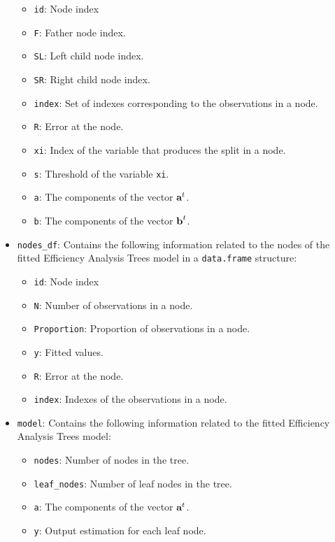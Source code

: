 \begin{itemize}
  \begin{itemize}
  \tightlist
  \item
    \texttt{id}: Node index
  \item
    \texttt{F}: Father node index.
  \item
    \texttt{SL}: Left child node index.
  \item
    \texttt{SR}: Right child node index.
  \item
    \texttt{index}: Set of indexes corresponding to the observations in a node.
  \item
    \texttt{R}: Error at the node.
  \item
    \texttt{xi}: Index of the variable that produces the split in a node.
  \item
    \texttt{s}: Threshold of the variable \texttt{xi}.
  \item
    \texttt{a}: The components of the vector \({\it \textbf{a}}^{t}\).
  \item
    \texttt{b}: The components of the vector \({\it \textbf{b}}^{t}\).
  \end{itemize}
\item
  \texttt{nodes\_df}: Contains the following information related to the nodes of the fitted Efficiency Analysis Trees model in a \texttt{data.frame} structure:

  \begin{itemize}
  \tightlist
  \item
    \texttt{id}: Node index
  \item
    \texttt{N}: Number of observations in a node.
  \item
    \texttt{Proportion}: Proportion of observations in a node.
  \item
    \texttt{y}: Fitted values.
  \item
    \texttt{R}: Error at the node.
  \item
    \texttt{index}: Indexes of the observations in a node.
  \end{itemize}
\item
  \texttt{model}: Contains the following information related to the fitted Efficiency Analysis Trees model:

  \begin{itemize}
  \tightlist
  \item
    \texttt{nodes}: Number of nodes in the tree.
  \item
    \texttt{leaf\_nodes}: Number of leaf nodes in the tree.
  \item
    \texttt{a}: The components of the vector \({\it \textbf{a}}^{t}\).
  \item
    \texttt{y}: Output estimation for each leaf node.
  \end{itemize}
\end{itemize}

